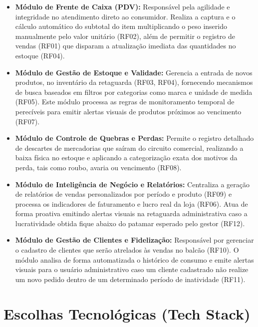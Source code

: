 \documentclass[
	12pt,				%
	openany,			%
	oneside,			%
	a4paper,			%
	english,			%
	french,				%
	spanish,			%
	brazil				%
	]{abntex2}
\begin{document}
\begin{itemize}
    \item \textbf{Módulo de Frente de Caixa (PDV):} Responsável pela agilidade e integridade no atendimento direto ao consumidor. Realiza a captura e o cálculo automático do subtotal do item multiplicando o peso inserido manualmente pelo valor unitário (RF02), além de permitir o registro de vendas (RF01) que disparam a atualização imediata das quantidades no estoque (RF04).
     
    \item \textbf{Módulo de Gestão de Estoque e Validade:} Gerencia a entrada de novos produtos, no inventário da retaguarda (RF03, RF04), fornecendo mecanismos de busca baseados em filtros por categorias como marca e unidade de medida (RF05). Este módulo processa as regras de monitoramento temporal de perecíveis para emitir alertas visuais de produtos próximos ao vencimento (RF07).
     
    \item \textbf{Módulo de Controle de Quebras e Perdas:} Permite o registro detalhado de descartes de mercadorias que saíram do circuito comercial, realizando a baixa física no estoque e aplicando a categorização exata dos motivos da perda, tais como roubo, avaria ou vencimento (RF08).
     
    \item \textbf{Módulo de Inteligência de Negócio e Relatórios:} Centraliza a geração de relatórios de vendas personalizados por período e produto (RF09) e processa os indicadores de faturamento e lucro real da loja (RF06). Atua de forma proativa emitindo alertas visuais na retaguarda administrativa caso a lucratividade obtida fique abaixo do patamar esperado pelo gestor (RF12).
     
    \item \textbf{Módulo de Gestão de Clientes e Fidelização:} Responsável por gerenciar o cadastro de clientes que serão atrelados às vendas no balcão (RF10). O módulo analisa de forma automatizada o histórico de consumo e emite alertas visuais para o usuário administrativo caso um cliente cadastrado não realize um novo pedido dentro de um determinado período de inatividade (RF11).
\end{itemize}

\section{Escolhas Tecnológicas (Tech Stack)}
\end{document}
